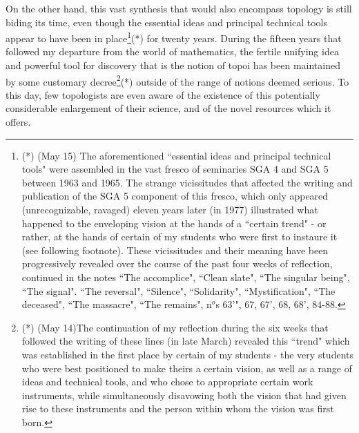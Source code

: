 On the other hand, this vast synthesis that would also encompass topology
is still biding its time, even though
the essential ideas and principal technical tools
appear to have been in place\footnote{(*) (May 15) The aforementioned ``essential ideas
and principal technical tools" were assembled in the vast fresco of seminaries SGA 4 and
SGA 5 between 1963 and 1965. The strange vicissitudes that affected the writing and
publication of the SGA 5 component of this fresco, which only appeared (unrecognizable,
ravaged) eleven years later (in 1977) illustrated what happened to the enveloping vision
at the hands of a ``certain trend" - or rather, at the hands of certain of my students who
were first to instaure it (see following footnote). These vicissitudes and their meaning
have been progressively revealed over the course of the past four weeks of reflection,
continued in the notes ``The accomplice", ``Clean slate", ``The singular being", ``The
signal". ``The reversal", ``Silence", ``Solidarity", ``Mystification", ``The deceased",
``The massacre", ``The remains", n$^o$s 63'", 67, 67', 68, 68', 84-88.}(*) for twenty years. 
During the fifteen years that followed my departure from the world of mathematics, the
fertile unifying idea and powerful tool for discovery that is the notion of topoi has been
maintained by some customary decree\footnote{(*) (May 14)The continuation of my reflection during the six weeks that followed
the writing of these lines (in late March) revealed this ``trend" which was established in
the first place by certain of my students - the very students who were best positioned to
make theirs a certain vision, as well as a range of ideas and technical tools, and who
chose to appropriate certain work instruments, while simultaneously disavowing both the
vision that had given rise to these instruments and the person within whom the vision was
first born.}(*) outside of the range of notions deemed
serious. To this day, few topologists are even aware of the existence of this
potentially considerable enlargement of their science, and of the novel resources which it
offers. 

